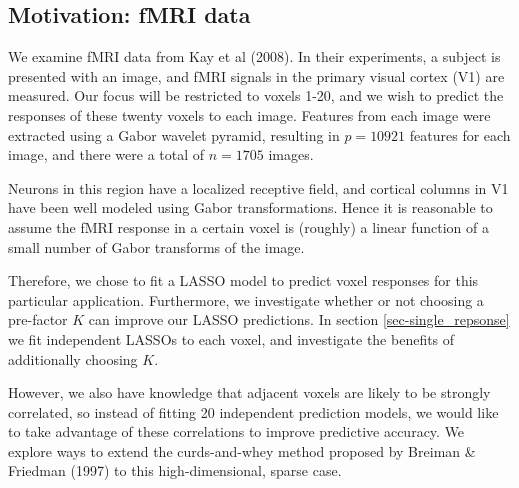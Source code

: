 \documentclass[main]{subfiles}
\begin{document}
\subsection{Motivation: fMRI data}
\label{sec-data}

We examine fMRI data from Kay et al (2008).  In their experiments, a subject is presented with an image, and
fMRI signals in the primary visual cortex (V1) are measured. Our focus will be restricted to voxels 1-20, and we wish to predict
the responses of these twenty voxels to each image. Features from each image were extracted using a Gabor wavelet pyramid,
resulting in $p = 10921$ features for each image, and there were a total of $n = 1705$ images.

Neurons in this region have a localized receptive field,
and cortical columns in V1 have been well modeled using Gabor transformations. Hence it is
reasonable to assume the fMRI response in a certain voxel is (roughly) a linear function of a small
number of Gabor transforms of the image.

Therefore, we chose to fit a LASSO model to predict voxel responses for this particular application.
Furthermore, we investigate whether or not choosing a pre-factor $K$ can improve
our LASSO predictions. In section \ref{sec-single_repsonse} we fit independent LASSOs to each voxel, and investigate the benefits of
additionally choosing $K$.

However, we also have knowledge that adjacent voxels are likely to be strongly correlated, so instead of fitting 20 independent
prediction models, we would like to take advantage of these correlations to improve predictive accuracy.
We explore ways to extend the curds-and-whey
method proposed by Breiman \& Friedman (1997) to this high-dimensional, sparse case.
\end{document}

